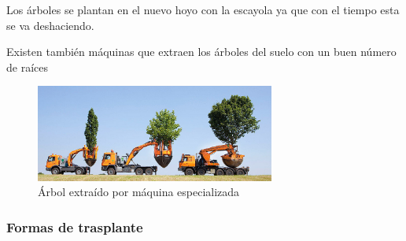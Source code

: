 \documentclass[a4paper,12pt,oneside]{article}
\begin{document}
\begin{enumerate}
\begin{enumerate}
Los árboles se plantan en el nuevo hoyo con la escayola ya que con el tiempo
esta se va deshaciendo.

Existen también máquinas que extraen los árboles del suelo con un buen número de
raíces  

\begin{figure}[htbp]
\centering
\includegraphics[width=0.7\textwidth]{./img_uf1596/arbol_transplante_maquina.jpg}
\caption{Árbol extraído por máquina especializada}
\end{figure}
\end{enumerate}
\end{enumerate}

\subsubsection{Formas de trasplante}
\label{sec:orgb0b3458}
\end{document}
